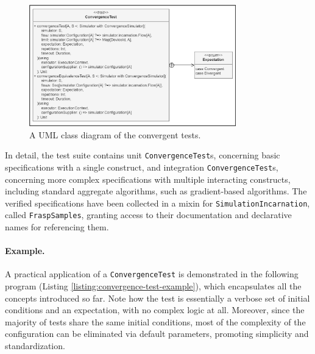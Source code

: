 \begin{figure}[!ht]
  \centering
  \includegraphics[width=0.8\textwidth]{resources/figures/convergence-test-class-diagram.png}
  \caption[A UML class diagram of the convergent tests]{
    A UML class diagram of the convergent tests.
  }
  \label{figure:convergent-test-class-diagram}
\end{figure}

In detail, the test suite contains unit \texttt{ConvergenceTest}s, concerning
basic specifications with a single construct, and integration
\texttt{ConvergenceTest}s, concerning more complex specifications with multiple
interacting constructs, including standard aggregate algorithms, such as
gradient-based algorithms. The verified specifications have been collected in a
mixin for \texttt{SimulationIncarnation}, called \texttt{FraspSamples},
granting access to their documentation and declarative names for referencing
them.

\paragraph{Example.}
A practical application of a \texttt{ConvergenceTest} is demonstrated in the
following program (Listing \ref{listing:convergence-test-example}), which
encapsulates all the concepts introduced so far. Note how the test is
essentially a verbose set of initial conditions and an expectation, with no
complex logic at all. Moreover, since the majority of tests share the same
initial conditions, most of the complexity of the configuration can be
eliminated via default parameters, promoting simplicity and standardization.

